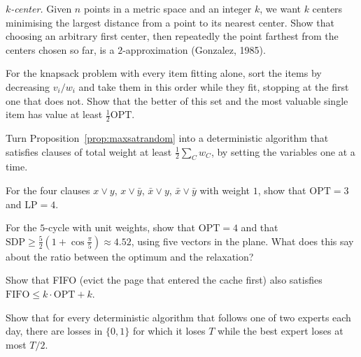 \begin{exercise}[$\star\star$]\label{ex:kcenter}
\emph{$k$-center.} Given $n$ points in a metric space and an integer $k$, we want $k$ centers minimising the largest distance from a point to its nearest center. Show that choosing an arbitrary first center, then repeatedly the point farthest from the centers chosen so far, is a $2$-approximation (Gonzalez, 1985).
\end{exercise}

\begin{exercise}[$\star$]\label{ex:knapsackgreedy}
For the knapsack problem with every item fitting alone, sort the items by decreasing $v_i/w_i$ and take them in this order while they fit, stopping at the first one that does not. Show that the better of this set and the most valuable single item has value at least $\frac12\mathrm{OPT}$.
\end{exercise}

\begin{exercise}[$\star$]\label{ex:maxsatderand}
Turn Proposition~\ref{prop:maxsatrandom} into a deterministic algorithm that satisfies clauses of total weight at least $\frac12\sum_Cw_C$, by setting the variables one at a time.
\end{exercise}

\begin{exercise}[$\star$]\label{ex:maxsatgap}
For the four clauses $x\vee y$, $x\vee\bar y$, $\bar x\vee y$, $\bar x\vee\bar y$ with weight $1$, show that $\mathrm{OPT}=3$ and $\mathrm{LP}=4$.
\end{exercise}

\begin{exercise}[$\star\star$]\label{ex:pentagon}
For the $5$-cycle with unit weights, show that $\mathrm{OPT}=4$ and that $\mathrm{SDP}\ge\frac52(1+\cos\frac\pi5)\approx4.52$, using five vectors in the plane. What does this say about the ratio between the optimum and the relaxation?
\end{exercise}

\begin{exercise}[$\star\star$]\label{ex:fifo}
Show that FIFO (evict the page that entered the cache first) also satisfies $\mathrm{FIFO}\le k\cdot\mathrm{OPT}+k$.
\end{exercise}

\begin{exercise}[$\star$]\label{ex:mwlower}
Show that for every deterministic algorithm that follows one of two experts each day, there are losses in $\{0,1\}$ for which it loses $T$ while the best expert loses at most $T/2$.
\end{exercise}

